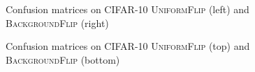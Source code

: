 \begin{figure}[h!]
\fi
\vspace{-0.2in}
\iflatexml
\caption{Confusion matrices on CIFAR-10 \textsc{UniformFlip} (left) and \textsc{BackgroundFlip} (right)}
\else
\caption{Confusion matrices on CIFAR-10 \textsc{UniformFlip} (top) and \textsc{BackgroundFlip} (bottom)}
\fi
\label{fig:confusion}
\vspace{-0.1in}
\end{figure}
